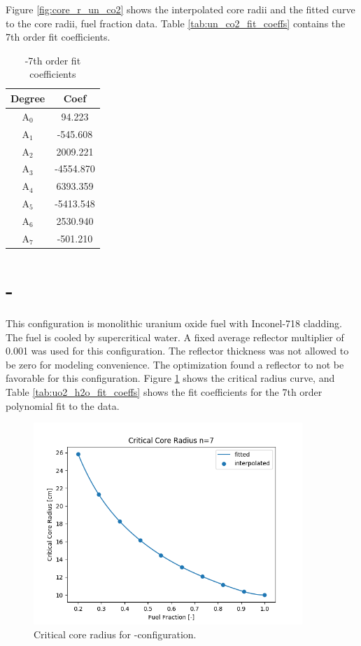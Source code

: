 Figure \ref{fig:core_r_un_co2} shows the interpolated core radii and the fitted
curve to the core radii, fuel fraction data. Table \ref{tab:un_co2_fit_coeffs}
contains the 7th order fit coefficients.

\begin{table}[h]
  \centering
  \caption{\uox-\codiox 7th order fit coefficients}
  \begin{tabular}{cc}
    \toprule
     Degree & Coef\\ 
    \midrule                                  
    A$_0$  &  94.223\\
    A$_1$  &  -545.608\\
    A$_2$  &  2009.221\\
    A$_3$  &  -4554.870\\
    A$_4$  &  6393.359\\
    A$_5$  &  -5413.548\\
    A$_6$  &  2530.940\\
    A$_7$  &  -501.210\\
  \end{tabular}
  \label{tab:uo2_co2_fit_coeffs}
\end{table}

\newpage
\section{\uox-\water}
This configuration is monolithic uranium oxide fuel with Inconel-718 cladding.
The fuel is cooled by supercritical water. A fixed average reflector multiplier
of 0.001 was used for this configuration. The reflector thickness was not
allowed to be zero for modeling convenience. The optimization found a
reflector to not be favorable for this configuration. Figure
\ref{fig:core_r_uo2_h2o} shows the critical radius curve, and Table
\ref{tab:uo2_h2o_fit_coeffs} shows the fit coefficients for the 7th order
polynomial fit to the data.

\begin{figure}[h]
    \centering
    \includegraphics[width=4in]{../images/core_r_uo2_h2o.png}
\caption{Critical core radius for \uox-\water configuration.}
\label{fig:core_r_uo2_h2o}
\end{figure}

